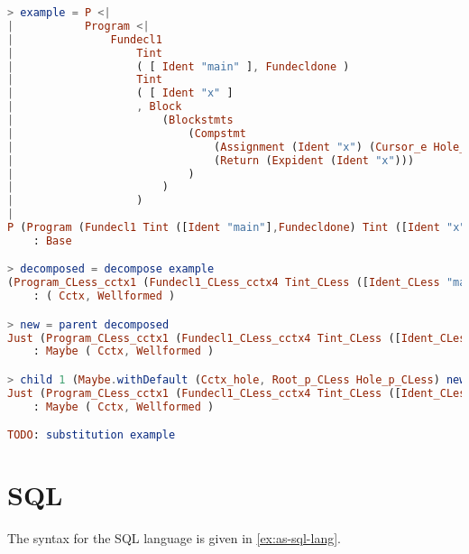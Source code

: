 \begin{lstlisting}[style=inline, language=elm, caption={Elm REPL demonstration of C language editor}, label={lst:c-repl}]
> example = P <|
|           Program <|
|               Fundecl1
|                   Tint
|                   ( [ Ident "main" ], Fundecldone )
|                   Tint
|                   ( [ Ident "x" ]
|                   , Block
|                       (Blockstmts
|                           (Compstmt
|                               (Assignment (Ident "x") (Cursor_e Hole_e))
|                               (Return (Expident (Ident "x")))
|                           )
|                       )
|                   )
|
P (Program (Fundecl1 Tint ([Ident "main"],Fundecldone) Tint ([Ident "x"],Block (Blockstmts (Compstmt (Assignment (Ident "x") (Cursor_e Hole_e)) (Return (Expident (Ident "x"))))))))
    : Base

> decomposed = decompose example
(Program_CLess_cctx1 (Fundecl1_CLess_cctx4 Tint_CLess ([Ident_CLess "main"],Fundecldone_CLess) Tint_CLess ([Ident_CLess "x"],Block_CLess_cctx1 (Blockstmts_CLess_cctx1 (Compstmt_CLess_cctx1 (Assignment_CLess_cctx2 (Ident_CLess "x") Cctx_hole) (Return_CLess (Expident_CLess (Ident_CLess "x"))))))),Root_e_CLess Hole_e_CLess)
    : ( Cctx, Wellformed )

> new = parent decomposed
Just (Program_CLess_cctx1 (Fundecl1_CLess_cctx4 Tint_CLess ([Ident_CLess "main"],Fundecldone_CLess) Tint_CLess ([Ident_CLess "x"],Block_CLess_cctx1 (Blockstmts_CLess_cctx1 (Compstmt_CLess_cctx1 Cctx_hole (Return_CLess (Expident_CLess (Ident_CLess "x"))))))),Root_s_CLess (Assignment_CLess (Ident_CLess "x") Hole_e_CLess))
    : Maybe ( Cctx, Wellformed )

> child 1 (Maybe.withDefault (Cctx_hole, Root_p_CLess Hole_p_CLess) new)
Just (Program_CLess_cctx1 (Fundecl1_CLess_cctx4 Tint_CLess ([Ident_CLess "main"],Fundecldone_CLess) Tint_CLess ([Ident_CLess "x"],Block_CLess_cctx1 (Blockstmts_CLess_cctx1 (Compstmt_CLess_cctx1 (Assignment_CLess_cctx1 Cctx_hole Hole_e_CLess) (Return_CLess (Expident_CLess (Ident_CLess "x"))))))),Root_id_CLess (Ident_CLess "x"))
    : Maybe ( Cctx, Wellformed )

TODO: substitution example
\end{lstlisting}

\section{SQL}

The syntax for the SQL language is given in \cref{ex:as-sql-lang}.

